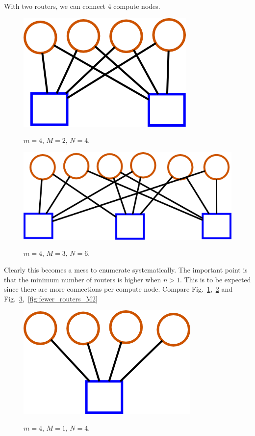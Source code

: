 \documentclass[pdftex]{article}
\begin{document}
With two routers, we can connect 4 compute nodes.

\begin{figure}[h!]
\begin{center}
\includegraphics[scale=0.3]{pictures/N4_n2_M2_m4}
\label{fig:ngt14}
 \caption{$m=4$, $M=2$, $N=4$.}
\end{center}
\end{figure}


\begin{figure}[h!]
\begin{center}
\includegraphics[scale=0.3]{pictures/N6_n2_M3_m4}
\label{fig:ngt16}
 \caption{$m=4$, $M=3$, $N=6$.}
\end{center}
\end{figure}

Clearly this becomes a mess to enumerate systematically. The important point is that the minimum number of routers is higher when $n>1$. This is to be expected since there are more connections per compute node. Compare Fig.~\ref{fig:ngt14},~\ref{fig:ngt16} and Fig.~\ref{fig:fewer_routers_M1},~\ref{fig:fewer_routers_M2}

\begin{figure}[h!]
\begin{center}
\includegraphics[scale=0.3]{pictures/N4_n1_M1_m4}
\label{fig:fewer_routers_M1}
 \caption{$m=4$, $M=1$, $N=4$.}
\end{center}
\end{figure}
\end{document}
